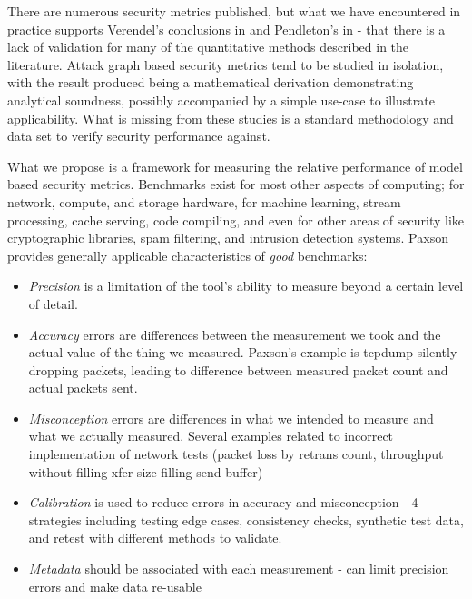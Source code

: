 There are numerous security metrics published, but what we have encountered in practice supports Verendel's conclusions in \cite{Verendel_2009} and Pendleton's in \cite{Pendleton_Garcia-Lebron_Cho_Xu_2016} - that there is a lack of validation for many of the quantitative methods described in the literature. Attack graph based security metrics tend to be studied in isolation, with the result produced being a mathematical derivation demonstrating analytical soundness, possibly accompanied by a simple use-case to illustrate applicability. What is missing from these studies is a standard methodology and data set to verify security performance against.


What we propose is a framework for measuring the relative performance of model based security metrics. Benchmarks exist for most other aspects of computing; for network, compute, and storage hardware, for machine learning, stream processing, cache serving, code compiling, and even for other areas of security like cryptographic libraries, spam filtering, and intrusion detection systems. Paxson \cite{Paxson_2004} provides generally applicable characteristics of \textit{good} benchmarks: 
\begin{itemize}
\item \textit{Precision} is a limitation of the tool's ability to measure beyond a certain level of detail.
\item \textit{Accuracy} errors are differences between the measurement we took and the actual value of the thing we measured. Paxson's example is tcpdump silently dropping packets, leading to difference between measured packet count and actual packets sent.
\item \textit{Misconception} errors are differences in what we intended to measure and what we actually measured. Several examples related to incorrect implementation of network tests (packet loss by retrans count, throughput without filling xfer size filling send buffer)
\item \textit{Calibration} is used to reduce errors in accuracy and misconception - 4 strategies including testing edge cases, consistency checks, synthetic test data, and retest with different methods to validate.
\item \textit{Metadata} should be associated with each measurement - can limit precision errors and make data re-usable
\end{itemize}

